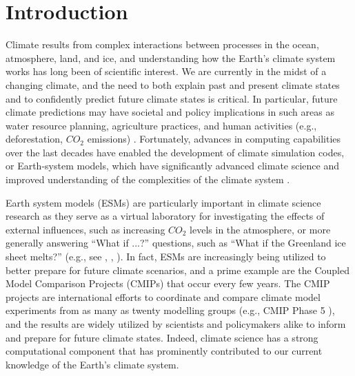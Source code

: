 \section{Introduction}\label{sec:intro}

Climate results from complex interactions between processes in the ocean, atmosphere, land, and ice, and understanding how the Earth's climate system works has long been of scientific interest.  We are currently in the midst of a changing climate, and the need to both explain past and present climate states and to confidently predict future climate states is critical.  In particular, future climate predictions may have societal and policy implications in such areas as water resource planning, agriculture practices, and human activities (e.g., deforestation, $CO_2$ emissions) \cite{washington2005}. Fortunately, advances in computing capabilities over the last decades have enabled the development of climate simulation codes, or Earth-system models, which have significantly advanced climate science and improved understanding of the complexities of the climate system \cite{washington2009}. 

Earth system models (ESMs) are particularly important in climate science research as they serve as a virtual laboratory for investigating the effects of external influences, such as increasing $CO_2$ levels in the atmosphere, or more generally answering ``What if ...?'' questions, such as ``What if the Greenland ice sheet melts?'' (e.g., see \cite{heavens2013}, \cite{zeebe2011}, \cite{easterbrook2009}).  In fact, ESMs are increasingly being utilized to better prepare for future climate scenarios, and a prime example are the Coupled Model Comparison Projects (CMIPs) that occur every few years.  The CMIP projects 
are international efforts to coordinate and compare climate model experiments from as many as twenty modelling groups (e.g., CMIP Phase 5 \citep{cmip5}), and the results
are widely utilized by scientists and policymakers alike to inform and prepare for future climate states. Indeed, climate science has a strong computational component that has prominently contributed to our current knowledge of the Earth's climate system.


